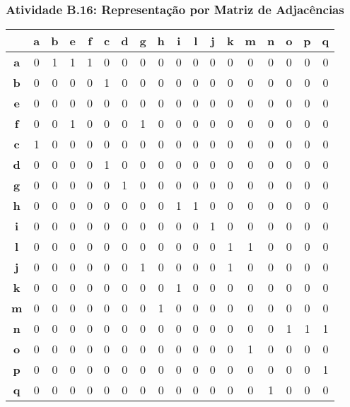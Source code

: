 \documentclass[a4paper,12pt]{article}
\begin{document}
\subsubsection*{Atividade B.16: Representação por Matriz de Adjacências}
\begin{center}
\tiny 
\begin{tabular*}{\textwidth}{c|@{\extracolsep{\fill}}ccccccccccccccccc}
\rowcolor[gray]{0.9}
 & \textbf{a} & \textbf{b} & \textbf{e} & \textbf{f} & \textbf{c} & \textbf{d} & \textbf{g} & \textbf{h} & \textbf{i} & \textbf{l} & \textbf{j} & \textbf{k} & \textbf{m} & \textbf{n} & \textbf{o} & \textbf{p} & \textbf{q} \\
\hline
\textbf{a} & 0 & 1 & 1 & 1 & 0 & 0 & 0 & 0 & 0 & 0 & 0 & 0 & 0 & 0 & 0 & 0 & 0 \\
\textbf{b} & 0 & 0 & 0 & 0 & 1 & 0 & 0 & 0 & 0 & 0 & 0 & 0 & 0 & 0 & 0 & 0 & 0 \\
\textbf{e} & 0 & 0 & 0 & 0 & 0 & 0 & 0 & 0 & 0 & 0 & 0 & 0 & 0 & 0 & 0 & 0 & 0 \\
\textbf{f} & 0 & 0 & 1 & 0 & 0 & 0 & 1 & 0 & 0 & 0 & 0 & 0 & 0 & 0 & 0 & 0 & 0 \\
\textbf{c} & 1 & 0 & 0 & 0 & 0 & 0 & 0 & 0 & 0 & 0 & 0 & 0 & 0 & 0 & 0 & 0 & 0 \\
\textbf{d} & 0 & 0 & 0 & 0 & 1 & 0 & 0 & 0 & 0 & 0 & 0 & 0 & 0 & 0 & 0 & 0 & 0 \\
\textbf{g} & 0 & 0 & 0 & 0 & 0 & 1 & 0 & 0 & 0 & 0 & 0 & 0 & 0 & 0 & 0 & 0 & 0 \\
\textbf{h} & 0 & 0 & 0 & 0 & 0 & 0 & 0 & 0 & 1 & 1 & 0 & 0 & 0 & 0 & 0 & 0 & 0 \\
\textbf{i} & 0 & 0 & 0 & 0 & 0 & 0 & 0 & 0 & 0 & 0 & 1 & 0 & 0 & 0 & 0 & 0 & 0 \\
\textbf{l} & 0 & 0 & 0 & 0 & 0 & 0 & 0 & 0 & 0 & 0 & 0 & 1 & 1 & 0 & 0 & 0 & 0 \\
\textbf{j} & 0 & 0 & 0 & 0 & 0 & 0 & 1 & 0 & 0 & 0 & 0 & 1 & 0 & 0 & 0 & 0 & 0 \\
\textbf{k} & 0 & 0 & 0 & 0 & 0 & 0 & 0 & 0 & 1 & 0 & 0 & 0 & 0 & 0 & 0 & 0 & 0 \\
\textbf{m} & 0 & 0 & 0 & 0 & 0 & 0 & 0 & 1 & 0 & 0 & 0 & 0 & 0 & 0 & 0 & 0 & 0 \\
\textbf{n} & 0 & 0 & 0 & 0 & 0 & 0 & 0 & 0 & 0 & 0 & 0 & 0 & 0 & 0 & 1 & 1 & 1 \\
\textbf{o} & 0 & 0 & 0 & 0 & 0 & 0 & 0 & 0 & 0 & 0 & 0 & 0 & 1 & 0 & 0 & 0 & 0 \\
\textbf{p} & 0 & 0 & 0 & 0 & 0 & 0 & 0 & 0 & 0 & 0 & 0 & 0 & 0 & 0 & 0 & 0 & 1 \\
\textbf{q} & 0 & 0 & 0 & 0 & 0 & 0 & 0 & 0 & 0 & 0 & 0 & 0 & 0 & 1 & 0 & 0 & 0 \\
\end{tabular*}
\end{center}
\end{document}
